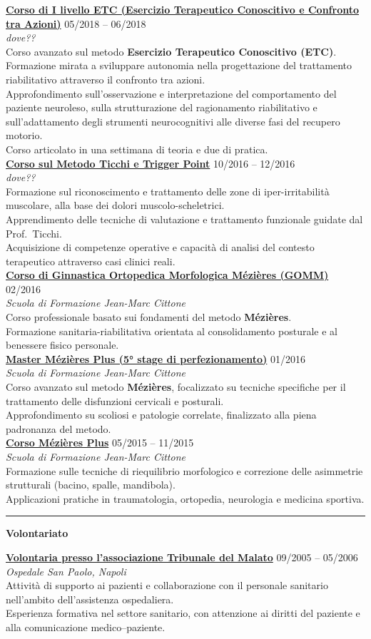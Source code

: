 \documentclass[a4paper]{article}
\newcommand{\block}[1]{\hrule \vspace{0.2cm} \textbf{\Large #1} \vspace{0.2cm}}
\newcommand{\voice}[5]{\href{#4}{\textbf{#1}} \hfill #2 \\ \textit{#3} \\ {\small #5} \vspace{0.2cm} \\}
\begin{document}
%
%
\voice{Corso di I livello ETC (Esercizio Terapeutico Conoscitivo e Confronto tra Azioni)}
{05/2018 -- 06/2018}
{dove??}
{}
{
Corso avanzato sul metodo \textbf{Esercizio Terapeutico Conoscitivo (ETC)}.\\
Formazione mirata a sviluppare autonomia nella progettazione del trattamento riabilitativo attraverso il confronto tra azioni.\\
Approfondimento sull’osservazione e interpretazione del comportamento del paziente neuroleso, sulla strutturazione del ragionamento riabilitativo e sull’adattamento degli strumenti neurocognitivi alle diverse fasi del recupero motorio.\\
Corso articolato in una settimana di teoria e due di pratica.
}
%
%
\voice{Corso sul Metodo Ticchi e Trigger Point}
{10/2016 -- 12/2016}
{dove??}
{}
{
Formazione sul riconoscimento e trattamento delle zone di iper-irritabilità muscolare, alla base dei dolori muscolo-scheletrici.\\
Apprendimento delle tecniche di valutazione e trattamento funzionale guidate dal Prof.\ Ticchi.\\
Acquisizione di competenze operative e capacità di analisi del contesto terapeutico attraverso casi clinici reali.
}
%
%
\voice{Corso di Ginnastica Ortopedica Morfologica Mézières (GOMM)}
{02/2016}
{Scuola di Formazione Jean-Marc Cittone}
{}
{
Corso professionale basato sui fondamenti del metodo \textbf{Mézières}.\\
Formazione sanitaria-riabilitativa orientata al consolidamento posturale e al benessere fisico personale.
}
%
%
\voice{Master Mézières Plus (5° stage di perfezionamento)}
{01/2016}
{Scuola di Formazione Jean-Marc Cittone}
{}
{
Corso avanzato sul metodo \textbf{Mézières}, focalizzato su tecniche specifiche per il trattamento delle disfunzioni cervicali e posturali.\\
Approfondimento su scoliosi e patologie correlate, finalizzato alla piena padronanza del metodo.
}
%
%
\voice{Corso Mézières Plus}
{05/2015 -- 11/2015}
{Scuola di Formazione Jean-Marc Cittone}
{}
{
Formazione sulle tecniche di riequilibrio morfologico e correzione delle asimmetrie strutturali (bacino, spalle, mandibola).\\
Applicazioni pratiche in traumatologia, ortopedia, neurologia e medicina sportiva.
}


    


    \block{Volontariato}

\voice{Volontaria presso l’associazione Tribunale del Malato}
{09/2005 -- 05/2006}
{Ospedale San Paolo, Napoli}
{}
{
Attività di supporto ai pazienti e collaborazione con il personale sanitario nell’ambito dell’assistenza ospedaliera.\\
Esperienza formativa nel settore sanitario, con attenzione ai diritti del paziente e alla comunicazione medico–paziente.
}
\end{document}
